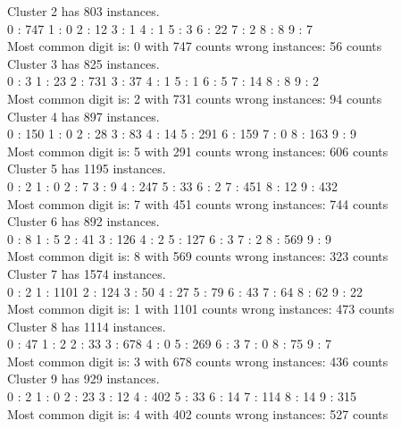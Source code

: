 \documentclass[paper=a4, fontsize=11pt]{scrartcl} %
\numberwithin{equation}{section} %
\numberwithin{figure}{section} %
\numberwithin{table}{section} %
\begin{document}
\begin{itemize}
Cluster 2 has 803 instances. \\
0 : 747 1 : 0   2 : 12  3 : 1   4 : 1   5 : 3   6 : 22  7 : 2   8 : 8   9 : 7\\
Most common digit is: 0 with 747 counts wrong instances: 56 counts\\

Cluster 3 has 825 instances.\\
0 : 3   1 : 23  2 : 731 3 : 37  4 : 1   5 : 1   6 : 5   7 : 14  8 : 8   9 : 2\\
Most common digit is: 2 with 731 counts wrong instances: 94 counts\\

Cluster 4 has 897 instances.\\
0 : 150 1 : 0   2 : 28  3 : 83  4 : 14  5 : 291 6 : 159 7 : 0   8 : 163 9 : 9\\
Most common digit is: 5 with 291 counts wrong instances: 606 counts\\

Cluster 5 has 1195 instances.\\
0 : 2   1 : 0   2 : 7   3 : 9   4 : 247 5 : 33  6 : 2   7 : 451 8 : 12  9 : 432\\
Most common digit is: 7 with 451 counts wrong instances: 744 counts\\

Cluster 6 has 892 instances.\\
0 : 8   1 : 5   2 : 41  3 : 126 4 : 2   5 : 127 6 : 3   7 : 2   8 : 569 9 : 9\\
Most common digit is: 8 with 569 counts wrong instances: 323 counts\\

Cluster 7 has 1574 instances.\\
0 : 2   1 : 1101        2 : 124 3 : 50  4 : 27  5 : 79  6 : 43  7 : 64  8 : 62  9 : 22\\
Most common digit is: 1 with 1101 counts        wrong instances: 473 counts\\

Cluster 8 has 1114 instances.\\
0 : 47  1 : 2   2 : 33  3 : 678 4 : 0   5 : 269 6 : 3   7 : 0   8 : 75  9 : 7\\
Most common digit is: 3 with 678 counts wrong instances: 436 counts\\

Cluster 9 has 929 instances.\\
0 : 2   1 : 0   2 : 23  3 : 12  4 : 402 5 : 33  6 : 14  7 : 114 8 : 14  9 : 315\\
Most common digit is: 4 with 402 counts wrong instances: 527 counts\\


\end{itemize}
\end{document}
